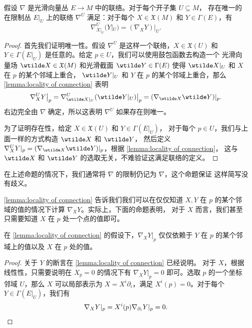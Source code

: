 \begin{proposition}[联络的限制]\label{prop:restriction of connection}
  假设 $\nabla$ 是光滑向量丛 $E\to M$ 中的联络。对于每个开子集 $U\subseteq M$，
  存在唯一的在限制丛 $E|_U$ 上的联络 $\nabla^U$ 满足：对于每个
  $X\in \mathfrak{X}(M)$ 和 $Y\in\Gamma(E)$，有
  \begin{equation}
    \nabla_{X|_U}^U(Y|_U)=(\nabla_XY)|_U.
  \end{equation}
\end{proposition}
\begin{proof}
  首先我们证明唯一性。假设 $\nabla^U$ 是这样一个联络，$X\in \mathfrak{X}(U)$
  和 $Y\in\Gamma(E|_U)$ 是任意的。给定 $p\in U$，我们可以使用鼓包函数去构造一个
  光滑向量场 $\wtilde X\in \mathfrak{X}(M)$ 和光滑截面 $\wtilde Y\in \Gamma(E)$
  使得 $\wtilde X|_U$ 和 $ X$ 在 $p$ 的某个邻域上重合，
  $\wtilde Y|_U$ 和 $ Y$ 在 $p$ 的某个邻域上重合，那么
  \autoref{lemma:locality of connection} 表明
  \[
    \nabla_X^UY\big|_p= \nabla_{\wtilde X|_U}^U (\wtilde Y|_U)\big|_p
    =(\nabla_{\wtilde X}\wtilde Y)|_p.
  \]
  右边完全由 $\nabla$ 确定，所以这表明 $\nabla^U$ 如果存在则唯一。

  为了证明存在性，给定 $X\in \mathfrak{X}(U)$ 和 $Y\in \Gamma(E|_U)$，
  对于每个 $p\in U$，我们与上面一样的方式构造 $\wtilde X$ 和 $\wtilde Y$，
  然后定义 $\nabla_X^UY|_p=(\nabla_{\wtilde X}\wtilde Y)|_p$，根据 \autoref{lemma:locality of connection}，
  这与 $\wtilde X$ 和 $\wtilde Y$ 的选取无关，不难验证这满足联络的定义。
\end{proof}

在上述命题的情况下，我们通常将 $\nabla$ 的限制仍记为 $\nabla$，这个命题保证
这样简写没有歧义。

\autoref{lemma:locality of connection} 告诉我们我们可以在仅仅知道
$X,Y$ 在 $p$ 的某个邻域的值的情况下计算 $\nabla_XY$。实际上，下面的命题表明，
对于 $X$ 而言，我们甚至只需要知道 $X$ 在 $p$ 处一个点的值即可。

\begin{proposition}\label{prop:connection depends on X at one point}
  在 \autoref{lemma:locality of connection} 的假设下，$\nabla_XY|_p$
  仅仅依赖于 $Y$ 在 $p$ 的某个邻域上的值以及 $X$ 在 $p$ 处的值。
\end{proposition}
\begin{proof}
  关于 $Y$ 的断言在 \autoref{lemma:locality of connection} 已经说明。
  对于 $X$，根据线性性，只需要说明在 $X_p=0$ 的情况下有
  $\nabla_XY|_p=0$ 即可。选取 $p$ 的一个坐标邻域 $U$，那么 $X$ 可以局部表示为
  $X=X^i\partial_i$，满足 $X^i(p)=0$。对于每个 $Y\in\Gamma(E|_U)$，我们有
  \[
    \nabla_XY|_p=X^i(p)\nabla_{\partial_i}Y|_p=0.\qedhere  
  \]
\end{proof}

